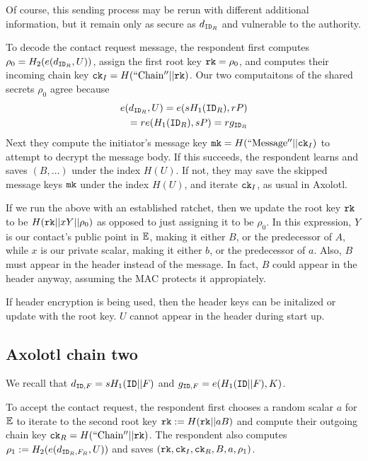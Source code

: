 \documentclass[twoside,letterpaper]{sig-alternate}
\begin{document}
Of course, this sending process may be rerun with different
additional information, but it remain only as secure as $d_{\mathtt{ID}_R}$
and vulnerable to the authority.

\smallskip

To decode the contact request message, the respondent
first computes $\rho_0 = H_2( e(d_{\mathtt{ID}_R}, U) )$,
 assign the first root key $\mathtt{rk} = \rho_0$, and 
computes their incoming chain key $\mathtt{ck}_I = H(\mathrm{``Chain''} || \mathtt{rk})$.
Our two computaitons of the shared secrets $\rho_0$ agree because
\begin{align*}
e(d_{\mathtt{ID}_R}, U) = e(s H_1(\mathtt{ID}_R), r P) \\
 \quad = r e(H_1(\mathtt{ID}_R), s P) = r g_{\mathtt{ID}_R}
\end{align*}
Next they compute the initiator's
 message key $\mathtt{mk} = H(\mathrm{``Message''}  || \mathtt{ck}_I)$
to attempt to decrypt the message body.
If this succeeds, the respondent learns and saves $(B,\ldots)$
 under the index $H(U)$.
If not, they may save the skipped message keys $\mathtt{mk}$ under
the index $H(U)$, and iterate $\mathtt{ck}_I$, as usual in Axolotl.

\smallskip %

If we run the above with an established ratchet, then we update
 the root key $\mathtt{rk}$ to be $H(\mathtt{rk} || x Y || \rho_0 )$ as opposed to
 just assigning it to be $\rho_0$.
In this expression, $Y$ is our contact's public point in $\mathbb{E}$, 
 making it either $B$, or the predecessor of $A$,
while $x$ is our private scalar,
 making it either $b$, or the predecessor of $a$.
Also, $B$ must appear in the header instead of the message.
In fact, $B$ could appear in the header anyway, 
 assuming the MAC protects it appropiately.

If header encryption is being used, then
 the header keys can be initalized or update with the root key.
$U$ cannot appear in the header during start up.

\subsection{Axolotl chain two}

We recall that $d_{\mathtt{ID},F} = s H_1(\mathtt{ID} || F)$ and
 $g_{\mathtt{ID},F} = e(H_1(\mathtt{ID} || F),K)$.

To accept the contact request, the respondent
first chooses a random scalar $a$ for $\mathbb{E}$ to
iterate to the second root key $\mathtt{rk} := H(\mathtt{rk} || a B)$ and
 compute their outgoing chain key $\mathtt{ck}_R = H(\mathrm{``Chain''} || \mathtt{rk})$.
The respondent also computes $\rho_1 := H_2( e(d_{\mathtt{ID}_R,F_R}, U) )$
and saves $(\mathtt{rk},\mathtt{ck}_I,\mathtt{ck}_R,B,a,\rho_1)$.
\end{document}
